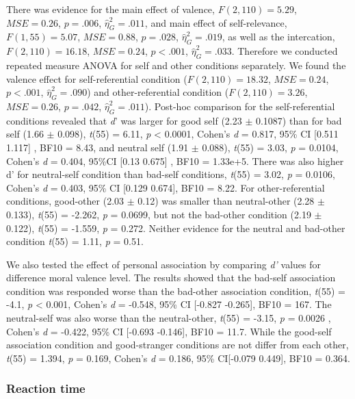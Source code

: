 \documentclass[man]{apa6}
\begin{document}
There was evidence for the main effect of valence, \(F(2, 110) = 5.29\), \(\mathit{MSE} = 0.26\), \(p = .006\), \(\hat{\eta}^2_G = .011\), and main effect of self-relevance, \(F(1, 55) = 5.07\), \(\mathit{MSE} = 0.88\), \(p = .028\), \(\hat{\eta}^2_G = .019\), as well as the intercation, \(F(2, 110) = 16.18\), \(\mathit{MSE} = 0.24\), \(p < .001\), \(\hat{\eta}^2_G = .033\). Therefore we conducted repeated measure ANOVA for self and other conditions separately. We found the valence effect for self-referential condition (\(F(2, 110) = 18.32\), \(\mathit{MSE} = 0.24\), \(p < .001\), \(\hat{\eta}^2_G = .090\)) and other-referential condition (\(F(2, 110) = 3.26\), \(\mathit{MSE} = 0.26\), \(p = .042\), \(\hat{\eta}^2_G = .011\)). Post-hoc comparison for the self-referential conditions revealed that \emph{d}' was larger for good self (2.23 \(\pm\) 0.1087) than for bad self (1.66 \(\pm\) 0.098), \emph{t}(55) = 6.11, \emph{p} \textless{} 0.0001, Cohen's \emph{d} = 0.817, 95\% CI {[}0.511 1.117{]} , BF10 = 8.43, and neutral self (1.91 \(\pm\) 0.088), \emph{t}(55) = 3.03, \emph{p} = 0.0104, Cohen's \emph{d} = 0.404, 95\%CI {[}0.13 0.675{]} , BF10 = 1.33e+5. There was also higher d' for neutral-self condition than bad-self conditions, \emph{t}(55) = 3.02, \emph{p} = 0.0106, Cohen's \emph{d} = 0.403, 95\% CI {[}0.129 0.674{]}, BF10 = 8.22. For other-referential conditions, good-other (2.03 \(\pm\) 0.12) was smaller than neutral-other (2.28 \(\pm\) 0.133), \emph{t}(55) = -2.262, \emph{p} = 0.0699, but not the bad-other condition (2.19 \(\pm\) 0.122), \emph{t}(55) = -1.559, \emph{p} = 0.272. Neither evidence for the neutral and bad-other condition \emph{t}(55) = 1.11, \emph{p} = 0.51.

We also tested the effect of personal association by comparing \emph{d'} values for difference moral valence level. The results showed that the bad-self association condition was responded worse than the bad-other association condition, \emph{t}(55) = -4.1, \emph{p} \textless{} 0.001, Cohen's \emph{d} = -0.548, 95\% CI {[}-0.827 -0.265{]}, BF10 = 167. The neutral-self was also worse than the neutral-other, \emph{t}(55) = -3.15, \emph{p} = 0.0026 , Cohen's \emph{d} = -0.422, 95\% CI {[}-0.693 -0.146{]}, BF10 = 11.7. While the good-self association condition and good-stranger conditions are not differ from each other, \emph{t}(55) = 1.394, \emph{p} = 0.169, Cohen's \emph{d} = 0.186, 95\% CI{[}-0.079 0.449{]}, BF10 = 0.364.

\hypertarget{reaction-time-4}{%
\subsubsection{Reaction time}\label{reaction-time-4}}
\end{document}
